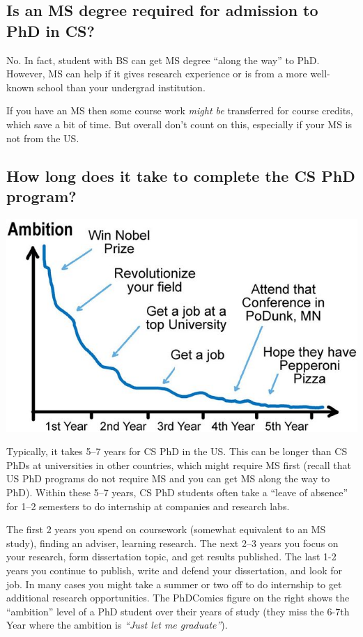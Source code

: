 \documentclass[11pt]{article}
\newenvironment{commentbox}[1][]{
\small
    \begin{cbox}
    \textbf{#1}: 
 }{
   \end{cbox}
}
\begin{document}
\subsection{Is an MS degree required for admission to PhD in CS?}
No. In fact, student with BS can get MS degree ``along the way'' to PhD.  However, MS can help if it gives research experience or is from a more well-known school than your undergrad institution. 

If you have an MS then some course work \emph{might be} transferred for course credits, which save a bit of time. But overall don't count on this, especially if your MS is not from the US. 


\subsection{How long does it take to complete the CS PhD program?}


\begin{center}
\includegraphics[scale=0.3]{c4a.png}
\end{center}


    Typically, it takes 5--7 years for CS PhD in the US.  This can be longer than CS PhDs at universities in other countries, which might require MS first (recall that US PhD programs do not require MS and you can get MS along the way to PhD). Within these 5--7 years, CS PhD students often take a ``leave of absence'' for 1--2 semesters to do internship at companies and research labs. 
    
    The first 2 years you spend on coursework (somewhat equivalent to an MS study), finding an adviser, learning research.  The next 2--3 years you focus on your research, form dissertation topic, and get results published. The last 1-2 years you continue to publish, write and defend your dissertation, and look for job. 
    In many cases you might take a summer or two off to do internship to get additional research opportunities.
    The PhDComics figure on the right shows the ``ambition'' level of a PhD student over their years of study (they miss the 6-7th Year where the ambition is \emph{``Just let me graduate''}).
\end{document}
